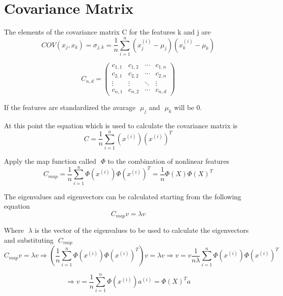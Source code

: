 \documentclass[11pt]{article}
\begin{document}
\section{Covariance Matrix}
The elements of the covariance matrix C for the features k and j are
\begin{equation*}
COV(x_j, x_k) = \sigma_{j,k} = \dfrac{1}{n}\sum_{i = 1}^{n} (x^{(i)}_j - \mu_{j})(x^{(i)}_k - \mu_{k})
\end{equation*}

\begin{equation*}
C_{n,d} = 
\begin{pmatrix}
c_{1,1} & c_{1,2} & \cdots & c_{1,n} \\
c_{2,1} & c_{2,2} & \cdots & c_{2,n} \\
\vdots  & \vdots  & \ddots & \vdots  \\
c_{n,1} & c_{n,2} & \cdots & c_{n,d} 
\end{pmatrix}
\end{equation*}

If the features are standardized the avarage \( \) $ \mu_{j} $ and \( \) $ \mu_{k} $ will be 0.

At this point the equation which is used to calculate the covariance matrix is
\begin{equation*}
C = \dfrac{1}{n}\sum_{i = 1}^{n} (x^{(i)})(x^{(i)})^T
\end{equation*}

Apply the map function called \( \) $ \Phi $ to the combination of nonlinear features
\begin{equation*}
C_{map} = \dfrac{1}{n}\sum_{i = 1}^{n} \Phi(x^{(i)})\Phi(x^{(i)})^T = \dfrac{1}{n}\Phi(X)\Phi(X)^T
\end{equation*}

The eigenvalues and eigenvectors can be calculated starting from the following equation
\begin{equation*}
C_{map}v = \lambda v 
\end{equation*}

Where \( \) $ \lambda $ is the vector of the eigenvalues to be used to calculate the eigenvectors and substituting \( \) $ C_{map} $ 
\begin{equation*}
C_{map}v = \lambda v \Rightarrow (\dfrac{1}{n}\sum_{i = 1}^{n} \Phi(x^{(i)})\Phi(x^{(i)})^T)v = \lambda v 
\Rightarrow v = v\dfrac{1}{n\lambda}\sum_{i = 1}^{n} \Phi(x^{(i)})\Phi(x^{(i)})^T
\end{equation*}

\begin{equation*}
\Rightarrow v = \dfrac{1}{n}\sum_{i = 1}^{n} \Phi(x^{(i)})a^{(i)} = \Phi(X)^Ta
\end{equation*}
\end{document}
